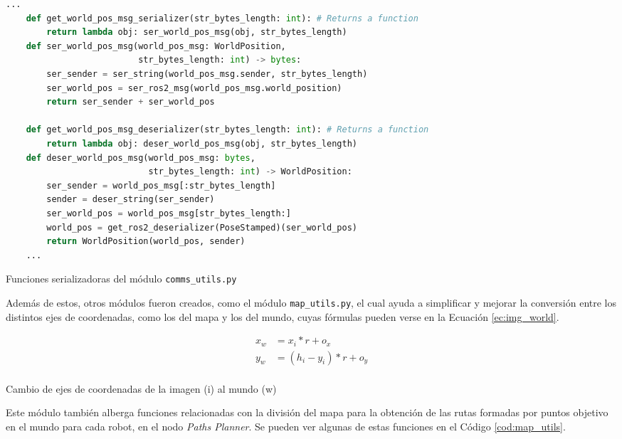 \begin{code}[h!]
  \begin{lstlisting}[language=Python]
    ...
    def get_world_pos_msg_serializer(str_bytes_length: int): # Returns a function
        return lambda obj: ser_world_pos_msg(obj, str_bytes_length)
    def ser_world_pos_msg(world_pos_msg: WorldPosition,
                          str_bytes_length: int) -> bytes:
        ser_sender = ser_string(world_pos_msg.sender, str_bytes_length)
        ser_world_pos = ser_ros2_msg(world_pos_msg.world_position)
        return ser_sender + ser_world_pos

    def get_world_pos_msg_deserializer(str_bytes_length: int): # Returns a function
        return lambda obj: deser_world_pos_msg(obj, str_bytes_length)
    def deser_world_pos_msg(world_pos_msg: bytes,
                            str_bytes_length: int) -> WorldPosition:
        ser_sender = world_pos_msg[:str_bytes_length]
        sender = deser_string(ser_sender)
        ser_world_pos = world_pos_msg[str_bytes_length:]
        world_pos = get_ros2_deserializer(PoseStamped)(ser_world_pos)
        return WorldPosition(world_pos, sender)
    ...
  \end{lstlisting}
\caption[Funciones serializadoras del módulo \texttt{comms\_utils.py}]{Funciones serializadoras del módulo \texttt{comms\_utils.py}}
\label{cod:comms_utils}
\end{code}

Además de estos, otros módulos fueron creados, como el módulo
\texttt{map\_utils.py}, el cual ayuda a simplificar y mejorar la conversión
entre los distintos ejes de coordenadas, como los del mapa y los del mundo,
cuyas fórmulas pueden verse en la Ecuación \ref{ec:img_world}.
\\

\begin{myequation}[h!]
  \begin{equation}
  \begin{aligned}
  x_w &= x_i * r + o_x  \\
  y_w &= (h_i - y_i) * r + o_y  \\
  \end{aligned}
  \label{ec:img_world}
  \end{equation}
  \caption[Cambio de ejes de coordenadas de la imagen (i) al mundo (w)]{Cambio de ejes de coordenadas de la imagen (i) al mundo (w)}
\end{myequation}

Este módulo también alberga funciones relacionadas con la división del mapa para
la obtención de las rutas formadas por puntos objetivo en el mundo para cada
robot, en el nodo \textit{Paths Planner}.
Se pueden ver algunas de estas funciones en el Código \ref{cod:map_utils}.
\\

